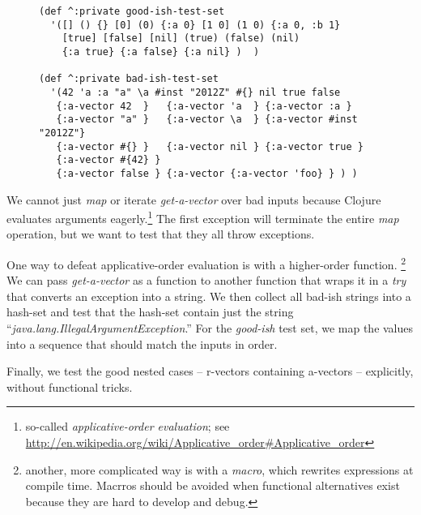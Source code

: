 \documentclass[11pt]{article}
\begin{document}
\begin{figure}[H]
\label{test-data-sets}
\begin{verbatim}
(def ^:private good-ish-test-set
  '([] () {} [0] (0) {:a 0} [1 0] (1 0) {:a 0, :b 1}
    [true] [false] [nil] (true) (false) (nil)
    {:a true} {:a false} {:a nil} )  )

(def ^:private bad-ish-test-set
  '(42 'a :a "a" \a #inst "2012Z" #{} nil true false
   {:a-vector 42  }   {:a-vector 'a  } {:a-vector :a }
   {:a-vector "a" }   {:a-vector \a  } {:a-vector #inst "2012Z"}
   {:a-vector #{} }   {:a-vector nil } {:a-vector true }
   {:a-vector #{42} }
   {:a-vector false } {:a-vector {:a-vector 'foo} } ) )
\end{verbatim}
\end{figure}

We cannot just \emph{map} or iterate \emph{get-a-vector} over bad inputs
because Clojure evaluates arguments eagerly.\footnote{so-called \emph{applicative-order evaluation}; see \url{http://en.wikipedia.org/wiki/Applicative_order#Applicative_order}}
The first exception will terminate the entire \emph{map} operation, but we
want to test that they all throw exceptions.

One way to defeat applicative-order evaluation is with a higher-order
function.  \footnote{another, more complicated way is with a \emph{macro},
   which rewrites expressions at compile time. Macrros should be avoided
   when functional alternatives exist because they are hard to develop
   and debug.}  We can pass \emph{get-a-vector} as a function to another
function that wraps it in a \emph{try} that converts an exception into a
string. We then collect all bad-ish strings into a hash-set and test
that the hash-set contain just the string
``\emph{java.lang.IllegalArgumentException}.'' For the \emph{good-ish}
test set, we map the values into a sequence that should match the
inputs in order.

Finally, we test the good nested cases -- r-vectors containing
a-vectors -- explicitly, without functional tricks.
\end{document}
